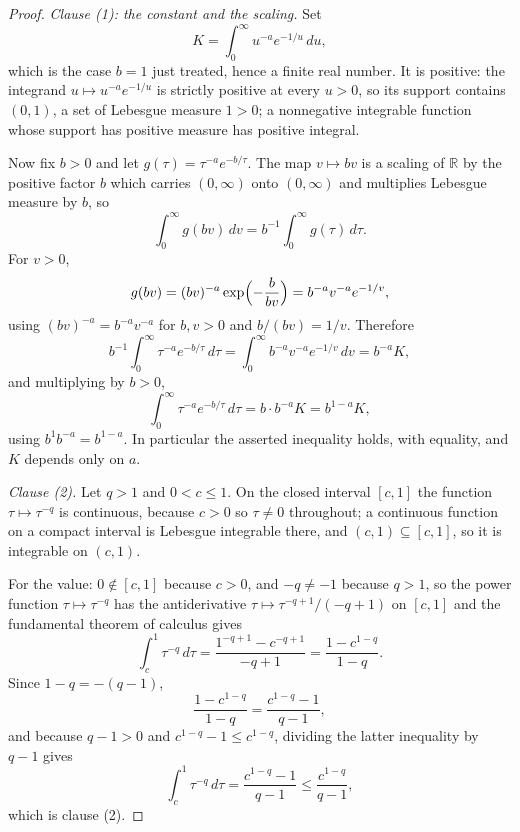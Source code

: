 \begin{proof}
\emph{Clause (1): the constant and the scaling.}  Set
\[
  K = \int_0^\infty u^{-a}e^{-1/u}\,du ,
\]
which is the case $b = 1$ just treated, hence a finite real number.  It is
positive: the integrand $u \mapsto u^{-a}e^{-1/u}$ is strictly positive at every
$u > 0$, so its support contains $(0,1)$, a set of Lebesgue measure $1 > 0$; a
nonnegative integrable function whose support has positive measure has positive
integral.

Now fix $b > 0$ and let $g(\tau) = \tau^{-a}e^{-b/\tau}$.  The map
$v \mapsto bv$ is a scaling of $\mathbb{R}$ by the positive factor $b$ which
carries $(0,\infty)$ onto $(0,\infty)$ and multiplies Lebesgue measure by $b$,
so
\[
  \int_0^\infty g(bv)\,dv = b^{-1}\int_0^\infty g(\tau)\,d\tau .
\]
For $v > 0$,
\[
  g(bv) = (bv)^{-a}\exp\Bigl(-\frac{b}{bv}\Bigr)
    = b^{-a}v^{-a}e^{-1/v} ,
\]
using $(bv)^{-a} = b^{-a}v^{-a}$ for $b,v > 0$ and $b/(bv) = 1/v$.  Therefore
\[
  b^{-1}\int_0^\infty \tau^{-a}e^{-b/\tau}\,d\tau
    = \int_0^\infty b^{-a}v^{-a}e^{-1/v}\,dv
    = b^{-a}K ,
\]
and multiplying by $b > 0$,
\[
  \int_0^\infty \tau^{-a}e^{-b/\tau}\,d\tau = b\cdot b^{-a}K = b^{1-a}K ,
\]
using $b^{1}b^{-a} = b^{1-a}$.  In particular the asserted inequality holds,
with equality, and $K$ depends only on $a$.

\emph{Clause (2).}  Let $q > 1$ and $0 < c \leq 1$.  On the closed interval
$[c,1]$ the function $\tau \mapsto \tau^{-q}$ is continuous, because $c > 0$ so
$\tau \neq 0$ throughout; a continuous function on a compact interval is
Lebesgue integrable there, and $(c,1) \subseteq [c,1]$, so it is integrable on
$(c,1)$.

For the value: $0 \notin [c,1]$ because $c > 0$, and $-q \neq -1$ because
$q > 1$, so the power function $\tau \mapsto \tau^{-q}$ has the antiderivative
$\tau \mapsto \tau^{-q+1}/(-q+1)$ on $[c,1]$ and the fundamental theorem of
calculus gives
\[
  \int_c^1\tau^{-q}\,d\tau
    = \frac{1^{-q+1} - c^{-q+1}}{-q+1}
    = \frac{1 - c^{1-q}}{1-q} .
\]
Since $1 - q = -(q-1)$,
\[
  \frac{1 - c^{1-q}}{1-q} = \frac{c^{1-q} - 1}{q-1} ,
\]
and because $q - 1 > 0$ and $c^{1-q} - 1 \leq c^{1-q}$, dividing the latter
inequality by $q-1$ gives
\[
  \int_c^1\tau^{-q}\,d\tau = \frac{c^{1-q}-1}{q-1} \leq \frac{c^{1-q}}{q-1} ,
\]
which is clause (2).
\end{proof}
